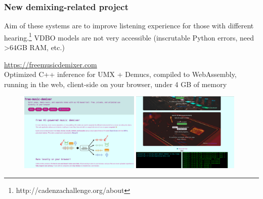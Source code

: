\documentclass[usenames,dvipsnames]{beamer}
\begin{document}
\begin{frame}
	\frametitle{New demixing-related project}
        Aim of these systems are to improve listening experience for those with different hearing.\footnote{http://cadenzachallenge.org/about} VDBO models are not very accessible (inscrutable Python errors, need >64GB RAM, etc.)
        \vspace{0.5em}

        \url{https://freemusicdemixer.com}\ \\
        \vspace{0.7em}
        Optimized C++ inference for UMX + Demucs, compiled to WebAssembly, running in the web, client-side on your browser, under 4 GB of memory
        \begin{figure}[ht]
		\centering
		\includegraphics[height=3.75cm]{./images/freemusicdemixer2.png}
		\includegraphics[height=3.75cm]{./images/freemusicdemixer.png}
	\end{figure}
\end{frame}
\end{document}
